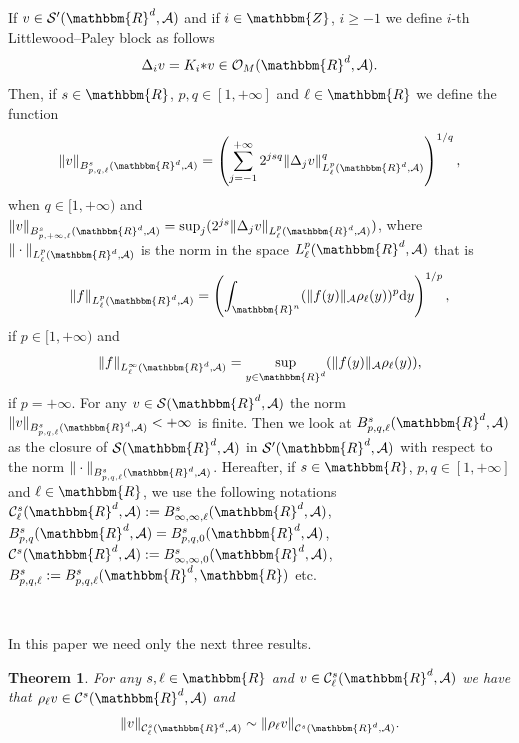 \documentclass[11pt]{article}
\newcommand{\assign}{:=}
\newcommand{\asterisk}{\mathord{*}}
\newcommand{\mathd}{\mathrm{d}}
\newtheorem{theorem}{Theorem}
\begin{document}
If $v \in \mathcal{S}' (\mathbbm{R}^d, \mathcal{A})$ and if $i \in
\mathbbm{Z}$, $i \geqslant - 1$ we define $i$-th Littlewood--Paley block as
follows
\[ \Delta_i v = K_i \asterisk v \in \mathcal{O}_M (\mathbbm{R}^d, \mathcal{A})
   . \]
Then, if $s \in \mathbbm{R}$, $p, q \in [1, + \infty]$ and $\ell \in
\mathbbm{R}$ we define the function
\[ \| v \|_{B^s_{p, q, \ell} (\mathbbm{R}^d, \mathcal{A})} = \left( \sum_{j = -
   1}^{+ \infty} 2^{j s q} \| \Delta_j v \|_{L^p_{\ell} (\mathbbm{R}^d,
   \mathcal{A})}^q \right)^{1 / q}, \]
when $q \in [1, + \infty)$ and $\| v \|_{B^s_{p, + \infty, \ell}
(\mathbbm{R}^d, \mathcal{A})} = \sup_j (2^{j s} \| \Delta_j v \|_{L^p_{\ell}
(\mathbbm{R}^d, \mathcal{A})})$, where $\| \cdot \|_{L^p_{\ell} (\mathbbm{R}^d,
\mathcal{A})}$ is the norm in the space $L_{\ell}^p (\mathbbm{R}^d,
\mathcal{A})$ that is
\[ \| f \|_{L^p_{\ell} (\mathbbm{R}^d, \mathcal{A})} = \left(
   \int_{\mathbbm{R}^n} (\| f (y) \|_{\mathcal{A}} \rho_{\ell} (y))^p \mathd y
   \right)^{1 / p}, \]
if $p \in [1, + \infty)$ and
\[ \| f \|_{L^{\infty}_{\ell} (\mathbbm{R}^d, \mathcal{A})} = \sup_{y \in
   \mathbbm{R}^d} (\| f (y) \|_{\mathcal{A}} \rho_{\ell} (y)), \]
if $p = + \infty$. For any $v \in \mathcal{S} (\mathbbm{R}^d, \mathcal{A})$ the
norm $\| v \|_{B^s_{p, q, \ell} (\mathbbm{R}^d, \mathcal{A})} < + \infty$ is
finite. Then we look at $B^s_{p, q, \ell} (\mathbbm{R}^d, \mathcal{A})$ as the
closure of $\mathcal{S} (\mathbbm{R}^d, \mathcal{A})$ in $\mathcal{S}'
(\mathbbm{R}^d, \mathcal{A})$ with respect to the norm $\| \cdot \|_{B^s_{p, q,
\ell} (\mathbbm{R}^d, \mathcal{A})}$. Hereafter, if $s \in \mathbbm{R}$, $p, q
\in [1, + \infty]$ and $\ell \in \mathbbm{R}$, we use the following notations
$\mathcal{C}^s_{\ell} (\mathbbm{R}^d, \mathcal{A}) \assign B^s_{\infty, \infty,
\ell} (\mathbbm{R}^d, \mathcal{A})$, $B^s_{p, q} (\mathbbm{R}^d, \mathcal{A}) =
B^s_{p, q, 0} (\mathbbm{R}^d, \mathcal{A})$, $\mathcal{C}^s (\mathbbm{R}^d,
\mathcal{A}) \assign B^s_{\infty, \infty, 0} (\mathbbm{R}^d, \mathcal{A})$,
$B^s_{p, q, \ell} \assign B^s_{p, q, \ell} (\mathbbm{R}^d, \mathbbm{R})$ etc.

\

In this paper we need only the next three results.

\begin{theorem}
  \label{theorem_weight}For any $s, \ell \in \mathbbm{R}$ and $v \in
  \mathcal{C}^s_{\ell} (\mathbbm{R}^d, \mathcal{A})$ we have that $\rho_{\ell}
  v \in \mathcal{C}^s (\mathbbm{R}^d, \mathcal{A})$ and
  \[ \| v \|_{\mathcal{C}^s_{\ell} (\mathbbm{R}^d, \mathcal{A})} \sim \|
     \rho_{\ell} v \|_{\mathcal{C}^s (\mathbbm{R}^d, \mathcal{A})} . \]
\end{theorem}
\end{document}
